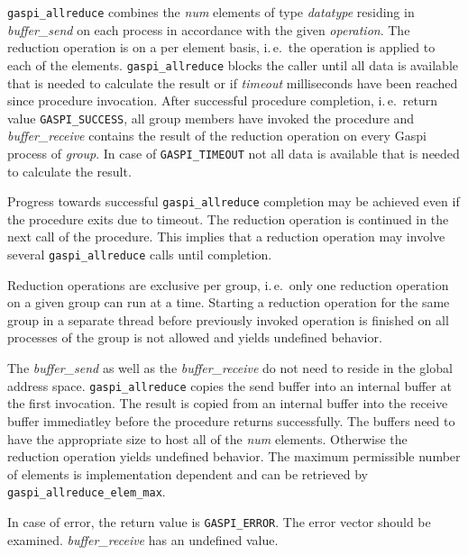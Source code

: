 \documentclass[a4paper]{article}
\newlength{\st}\setlength{\st}{0pt}
\newcommand{\zsep}[1]{#1}
\newcommand{\gaspiprefix}{gaspi}
\newcommand{\GASPI}{{\sc Gaspi}}
\newcommand{\function}[1]{{\tt #1}}
\newcommand{\parameter}[1]{{\it #1}}
\newcommand{\gaspifunction}[1]{\function{\protect\zsep{\gaspiprefix\_#1}}}
\newcommand{\GASPISUCC}{{\tt\protect\zsep{GASPI\_SUCCESS}}}
\newcommand{\GASPITIME}{{\tt\protect\zsep{GASPI\_TIMEOUT}}}
\newcommand{\GASPIGERR}{{\tt\protect\zsep{GASPI\_ERROR}}}
\begin{document}
\gaspifunction{allreduce} combines the \parameter{num} elements of
type \parameter{datatype} residing in \parameter{buffer\_send} on each
process in accordance with the given \parameter{operation}.  The
reduction operation is on a per element basis, i.\,e.\ the operation
is applied to each of the elements. \gaspifunction{allreduce} blocks
the caller until all data is available that is needed to calculate the
result or if \parameter{timeout} milliseconds have been reached since
procedure invocation. After successful procedure completion, i.\,e.\
return value \GASPISUCC{}, all group members have invoked the
procedure and \parameter{buffer\_receive} contains the result of the
reduction operation on every \GASPI{} process of \parameter{group}.
In case of \GASPITIME{} not all data is available that is needed to
calculate the result.

Progress towards successful \gaspifunction{allreduce} completion may be achieved even if the procedure
exits due to timeout. The reduction operation is continued in the next call of the procedure. This implies that a
reduction operation may involve several \gaspifunction{allreduce} calls until
completion.

Reduction operations are exclusive per group, i.\,e.\ only one reduction
operation on a given group can run at a time. Starting a
reduction operation for the same group in a separate thread before previously invoked operation
is finished on all processes of the group
is not allowed and yields undefined behavior.

The \parameter{buffer\_send} as well as the \parameter{buffer\_receive} do not need
to reside in the global address space. \gaspifunction{allreduce} copies the send
buffer into an internal buffer at the first invocation. The result is copied from
an internal buffer into the receive buffer immediatley before the procedure returns
successfully.
The buffers need to have the appropriate
size to host all of the \parameter{num} elements. Otherwise the reduction operation yields
undefined behavior.
The maximum permissible number of elements
is implementation dependent and can be retrieved by \gaspifunction{allreduce\_elem\_max}.



In case of error, the return value is \GASPIGERR{}. The error vector should be
examined. \parameter{buffer\_receive} has an undefined value.
\end{document}
